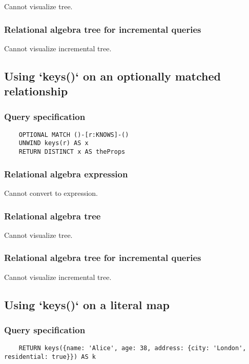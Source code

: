 	Cannot visualize tree.

	\subsubsection*{Relational algebra tree for incremental queries}

	Cannot visualize incremental tree.
	\subsection{Using `keys()` on an optionally matched relationship}

	\subsubsection*{Query specification}

	\begin{lstlisting}
	OPTIONAL MATCH ()-[r:KNOWS]-()
	UNWIND keys(r) AS x
	RETURN DISTINCT x AS theProps
	\end{lstlisting}


	\subsubsection*{Relational algebra expression}

	Cannot convert to expression.

	\subsubsection*{Relational algebra tree}

	Cannot visualize tree.

	\subsubsection*{Relational algebra tree for incremental queries}

	Cannot visualize incremental tree.
	\subsection{Using `keys()` on a literal map}

	\subsubsection*{Query specification}

	\begin{lstlisting}
	RETURN keys({name: 'Alice', age: 38, address: {city: 'London', residential: true}}) AS k
	\end{lstlisting}


